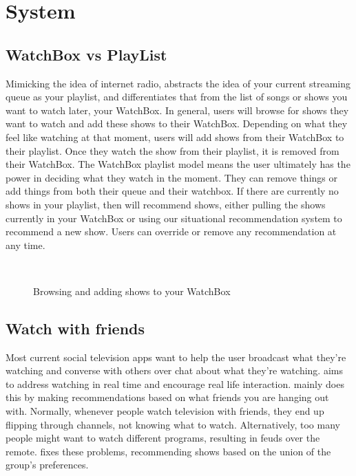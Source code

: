 \section{System}

\subsection{WatchBox vs PlayList}
Mimicking the idea of internet radio, {\sys} abstracts the idea of
your current streaming queue as your playlist, and differentiates that
from the list of songs or shows you want to watch later, your
WatchBox.  In general, users will browse for shows they want to watch
and add these shows to their WatchBox.  Depending on what they feel
like watching at that moment, users will add shows from their WatchBox
to their playlist.  Once they watch the show from their playlist, it
is removed from their WatchBox.  The WatchBox playlist model means the
user ultimately has the power in deciding what they watch in the
moment.  They can remove things or add things from both their queue
and their watchbox.  If there are currently no shows in your playlist,
then {\sys} will recommend shows, either pulling the shows currently
in your WatchBox or using our situational recommendation system to
recommend a new show.  Users can override or remove any recommendation
at any time.


\begin{figure}
\centering
{}
~~
\caption{Browsing and adding shows to your WatchBox}
\label{fig:watchbox}
\end{figure}

\subsection{Watch with friends}
Most current social television apps want to help the user broadcast
what they’re watching and converse with others over chat about what
they’re watching.  {\sys} aims to address watching in real time and
encourage real life interaction.  {\sys} mainly does this by making
recommendations based on what friends you are hanging out with.
Normally, whenever people watch television with friends, they end up
flipping through channels, not knowing what to watch.  Alternatively,
too many people might want to watch different programs, resulting in
feuds over the remote.  {\sys} fixes these problems, recommending
shows based on the union of the group’s preferences.

